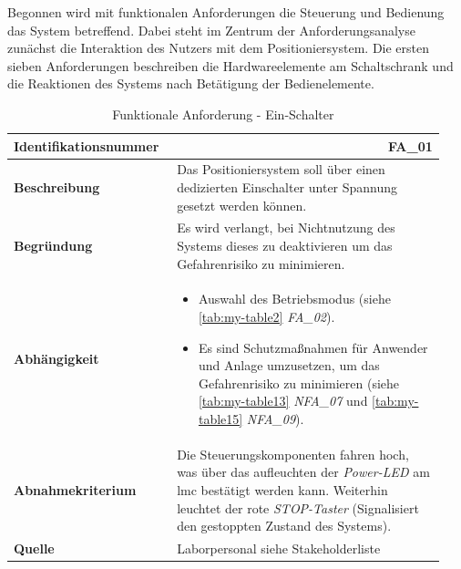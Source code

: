 \documentclass[../../../Bachelorarbeit.tex]{subfiles}
\begin{document}
\bigskip
Begonnen wird mit funktionalen Anforderungen die Steuerung und Bedienung das System betreffend. Dabei steht im Zentrum der Anforderungsanalyse zunächst die Interaktion des Nutzers mit dem Positioniersystem. Die ersten sieben Anforderungen beschreiben die Hardwareelemente am Schaltschrank und die Reaktionen des Systems nach Betätigung der Bedienelemente.
\begin{table}[H]
    \centering
    \begin{tabular}{ p{0.34\linewidth}  p{0.6\linewidth} }
        \hline
        \textbf{Identifikationsnummer}  & \multicolumn{1}{r}{FA\_01} \\ \hline
        \textbf{Beschreibung}           & Das Positioniersystem soll über einen dedizierten Einschalter unter Spannung gesetzt werden können. \\
        \textbf{Begründung}             & Es wird verlangt, bei Nichtnutzung des Systems dieses zu deaktivieren um das Gefahrenrisiko zu minimieren. \\
        \textbf{Abhängigkeit}           &   {\begin{itemize}[noitemsep,topsep=0pt,parsep=0pt,partopsep=0pt,leftmargin=*]
                                                \item Auswahl des Betriebsmodus (siehe \autoref{tab:my-table2} \textit{FA\_02}).
                                                \item Es sind Schutzmaßnahmen für Anwender und Anlage umzusetzen, um das Gefahrenrisiko zu minimieren (siehe \autoref{tab:my-table13} \textit{NFA\_07} und \autoref{tab:my-table15} \textit{NFA\_09}).
                                            \end{itemize}} \\
        \textbf{Abnahmekriterium}       & Die Steuerungskomponenten fahren hoch, was über das aufleuchten der \textit{Power-LED} am \acs{lmc} bestätigt werden kann. Weiterhin leuchtet der rote \textit{STOP-Taster} (Signalisiert den gestoppten Zustand des Systems). \\
        \textbf{Quelle}                 & Laborpersonal siehe Stakeholderliste \\ \hline
    \end{tabular}
    \caption[\acs{fa} - EIN-Schalter]{Funktionale Anforderung - Ein-Schalter}
    \label{tab:my-table}
\end{table}
\end{document}
